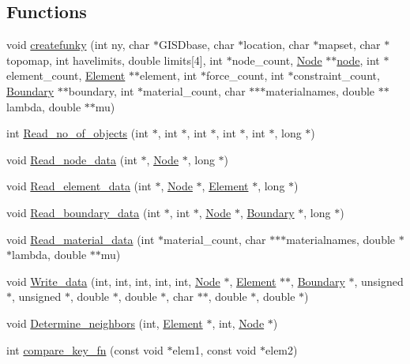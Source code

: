 \subsection*{Functions}
\begin{CompactItemize}
\item 
void \hyperlink{oldpreprocess_8C_a1}{createfunky} (int ny, char $\ast$GISDbase, char $\ast$location, char $\ast$mapset, char $\ast$topomap, int havelimits, double limits\mbox{[}4\mbox{]}, int $\ast$node\_\-count, \hyperlink{classNode}{Node} $\ast$$\ast$\hyperlink{structnode}{node}, int $\ast$element\_\-count, \hyperlink{classElement}{Element} $\ast$$\ast$element, int $\ast$force\_\-count, int $\ast$constraint\_\-count, \hyperlink{classBoundary}{Boundary} $\ast$$\ast$boundary, int $\ast$material\_\-count, char $\ast$$\ast$$\ast$materialnames, double $\ast$$\ast$lambda, double $\ast$$\ast$mu)
\item 
int \hyperlink{oldpreprocess_8C_a2}{Read\_\-no\_\-of\_\-objects} (int $\ast$, int $\ast$, int $\ast$, int $\ast$, int $\ast$, long $\ast$)
\item 
void \hyperlink{oldpreprocess_8C_a3}{Read\_\-node\_\-data} (int $\ast$, \hyperlink{classNode}{Node} $\ast$, long $\ast$)
\item 
void \hyperlink{oldpreprocess_8C_a4}{Read\_\-element\_\-data} (int $\ast$, \hyperlink{classNode}{Node} $\ast$, \hyperlink{classElement}{Element} $\ast$, long $\ast$)
\item 
void \hyperlink{oldpreprocess_8C_a5}{Read\_\-boundary\_\-data} (int $\ast$, int $\ast$, \hyperlink{classNode}{Node} $\ast$, \hyperlink{classBoundary}{Boundary} $\ast$, long $\ast$)
\item 
void \hyperlink{oldpreprocess_8C_a6}{Read\_\-material\_\-data} (int $\ast$material\_\-count, char $\ast$$\ast$$\ast$materialnames, double $\ast$$\ast$lambda, double $\ast$$\ast$mu)
\item 
void \hyperlink{oldpreprocess_8C_a7}{Write\_\-data} (int, int, int, int, int, \hyperlink{classNode}{Node} $\ast$, \hyperlink{classElement}{Element} $\ast$$\ast$, \hyperlink{classBoundary}{Boundary} $\ast$, unsigned $\ast$, unsigned $\ast$, double $\ast$, double $\ast$, char $\ast$$\ast$, double $\ast$, double $\ast$)
\item 
void \hyperlink{oldpreprocess_8C_a8}{Determine\_\-neighbors} (int, \hyperlink{classElement}{Element} $\ast$, int, \hyperlink{classNode}{Node} $\ast$)
\item 
int \hyperlink{oldpreprocess_8C_a9}{compare\_\-key\_\-fn} (const void $\ast$elem1, const void $\ast$elem2)
$$
\end{CompactItemize}
